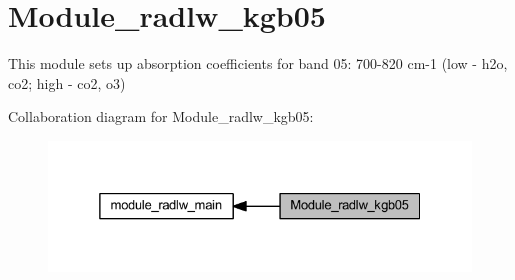 \hypertarget{group__module__radlw__kgb05}{}\section{Module\+\_\+radlw\+\_\+kgb05}
\label{group__module__radlw__kgb05}


This module sets up absorption coefficients for band 05\+: 700-\/820 cm-\/1 (low -\/ h2o, co2; high -\/ co2, o3)  


Collaboration diagram for Module\+\_\+radlw\+\_\+kgb05\+:\nopagebreak
\begin{figure}[H]
\begin{center}
\leavevmode
\includegraphics[width=325pt]{group__module__radlw__kgb05}
\end{center}
\end{figure}
